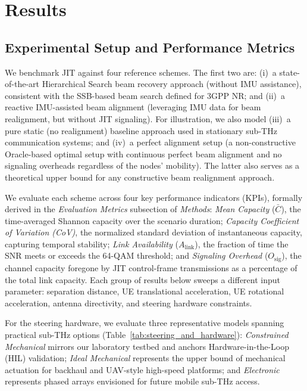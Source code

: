\documentclass[fleqn,10pt]{wlscirep}
\newcommand{\rev}[1]{#1}
\begin{document}
\section*{Results}

\rev{\subsection*{Experimental Setup and Performance Metrics}}

We benchmark JIT against four reference schemes. The first two are: (i)~a \rev{state-of-the-art Hierarchical Search beam recovery approach (without IMU assistance)\cite{photonics11060540}, consistent with the SSB-based beam search defined for 3GPP NR\cite{Giordani2018ATO, Heng2021SixChallenges}}; and (ii)~a reactive IMU-assisted beam alignment (leveraging IMU data for beam realignment, but without JIT signaling)\rev{\cite{s141019622, Brambilla_2019, 9391649}}. For illustration, we also model (iii)~a pure static (no realignment) baseline approach used in stationary sub-THz communication systems; and (iv)~a perfect alignment setup (a non-constructive Oracle-based optimal setup with continuous perfect beam alignment and no signaling overheads regardless of the nodes' mobility). The latter also serves as a theoretical upper bound for any constructive beam realignment approach.

We evaluate each scheme across four key performance indicators (KPIs), formally derived in the \textit{Evaluation Metrics} subsection of \textit{Methods}: \emph{Mean Capacity} ($\bar{C}$), the time-averaged Shannon capacity over the scenario duration; \emph{Capacity Coefficient of Variation (CoV)}, the normalized standard deviation of instantaneous capacity, capturing temporal stability; \emph{Link Availability} ($A_{\text{link}}$), the fraction of time the SNR meets or exceeds the 64-QAM threshold; and \emph{Signaling Overhead} ($O_{\text{sig}}$), the channel capacity foregone by JIT control-frame transmissions as a percentage of the total link capacity. Each group of results below sweeps a different input parameter: separation distance, UE translational acceleration, UE rotational acceleration, antenna directivity, and steering hardware constraints.

For the steering hardware, we evaluate three representative models spanning practical sub-THz options (Table~\ref{tab:steering_and_hardware}): \textit{Constrained Mechanical} mirrors our laboratory testbed and anchors Hardware-in-the-Loop (HIL) validation; \textit{Ideal Mechanical} represents the upper bound of mechanical actuation for backhaul and UAV-style high-speed platforms; and \textit{Electronic} represents phased arrays envisioned for future mobile sub-THz access.
\end{document}
